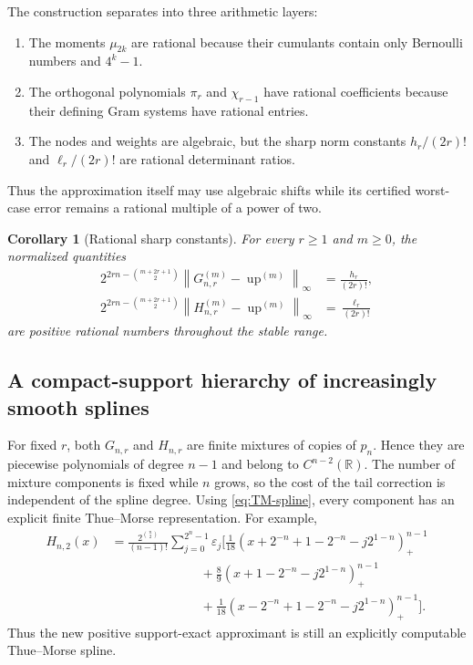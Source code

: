 \documentclass[11pt]{article}
\numberwithin{equation}{section}
\newtheorem{corollary}[theorem]{Corollary}
\theoremstyle{definition}
\theoremstyle{remark}
\newcommand{\R}{\mathbb R}
\newcommand{\Up}{\operatorname{up}}
\newcommand{\norm}[1]{\left\lVert#1\right\rVert}
\newcommand{\pospart}[1]{\left(#1\right)_{+}}
\newcommand{\TM}{\varepsilon}
\begin{document}
The construction separates into three arithmetic layers:
\begin{enumerate}
\item The moments $\mu_{2k}$ are rational because their cumulants contain only Bernoulli numbers and $4^k-1$.
\item The orthogonal polynomials $\pi_r$ and $\chi_{r-1}$ have rational coefficients because their defining Gram systems have rational entries.
\item The nodes and weights are algebraic, but the sharp norm constants $h_r/(2r)!$ and $\ell_r/(2r)!$ are rational determinant ratios.
\end{enumerate}
Thus the approximation itself may use algebraic shifts while its certified worst-case error remains a rational multiple of a power of two.

\begin{corollary}[Rational sharp constants]
For every $r\ge1$ and $m\ge0$, the normalized quantities
\begin{align}
 2^{2rn-\binom{m+2r+1}{2}}
 \norm{G_{n,r}^{(m)}-\Up^{(m)}}_\infty
 &=\frac{h_r}{(2r)!},\label{eq:rational-G-normalized}\\
 2^{2rn-\binom{m+2r+1}{2}}
 \norm{H_{n,r}^{(m)}-\Up^{(m)}}_\infty
 &=\frac{\ell_r}{(2r)!}
 \label{eq:rational-L-normalized}
\end{align}
are positive rational numbers throughout the stable range.
\end{corollary}

\subsection{A compact-support hierarchy of increasingly smooth splines}

For fixed $r$, both $G_{n,r}$ and $H_{n,r}$ are finite mixtures of copies of $p_n$.  Hence they are piecewise polynomials of degree $n-1$ and belong to $C^{n-2}(\R)$.  The number of mixture components is fixed while $n$ grows, so the cost of the tail correction is independent of the spline degree.  Using \eqref{eq:TM-spline}, every component has an explicit finite Thue--Morse representation.  For example,
\begin{align}
 H_{n,2}(x)
 &=\frac{2^{\binom n2}}{(n-1)!}
 \sum_{j=0}^{2^n-1}\TM_j
 \Bigg[
 \frac1{18}\pospart{x+2^{-n}+1-2^{-n}-j2^{1-n}}^{n-1}\nonumber\\
 &\hspace{7em}+\frac89\pospart{x+1-2^{-n}-j2^{1-n}}^{n-1}\nonumber\\
 &\hspace{7em}+\frac1{18}\pospart{x-2^{-n}+1-2^{-n}-j2^{1-n}}^{n-1}
 \Bigg].
 \label{eq:Hn2-TM}
\end{align}
Thus the new positive support-exact approximant is still an explicitly computable Thue--Morse spline.
\end{document}
